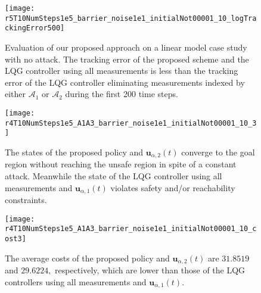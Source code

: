 \documentclass[journal]{IEEEtran}
\begin{document}

\begin{figure}
    \centering
    \texttt{[image: r5T10NumSteps1e5\_barrier\_noise1e1\_initialNot00001\_10\_logTrackingError500]}
    \caption{Evaluation of our proposed approach on a linear model case study with no attack. The tracking error of the proposed scheme and the LQG controller using all measurements is less than the tracking error of the LQG controller eliminating measurements indexed by either $\mathcal{A}_1$ or $\mathcal{A}_2$ during the first 200 time steps. }
    \label{fig:no_attack_tracking_error}
\end{figure}

\begin{figure}
    \centering
    \texttt{[image: r4T10NumSteps1e5\_A1A3\_barrier\_noise1e1\_initialNot00001\_10\_3]}
    \caption{The states of the proposed policy and $\mathbf{u}_{\alpha,2}(t)$ converge to the goal region without reaching the unsafe region in spite of a constant attack. Meanwhile the state of the LQG controller using all measurements and $\mathbf{u}_{\alpha,1}(t)$ violates safety and/or reachability constraints.}
    \label{fig:attack-trajectory}
\end{figure}

\begin{figure}
    \centering
    \texttt{[image: r4T10NumSteps1e5\_A1A3\_barrier\_noise1e1\_initialNot00001\_10\_cost3]}
    \caption{The average costs of the proposed policy and $\mathbf{u}_{\alpha,2}(t)$ are $31.8519$ and $29.6224,$ respectively, which are lower than those of the LQG controllers using all measurements and $\mathbf{u}_{\alpha,1}(t)$.}
    \label{fig:attack-cost}
\end{figure}
\end{document}

